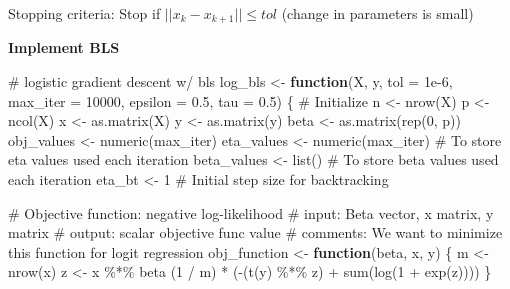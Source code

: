 \documentclass[
  letterpaper,
  DIV=11,
  numbers=noendperiod]{scrartcl}
\newenvironment{Shaded}{\begin{snugshade}}{\end{snugshade}}
\newcommand{\AttributeTok}[1]{\textcolor[rgb]{0.40,0.45,0.13}{#1}}
\newcommand{\CommentTok}[1]{\textcolor[rgb]{0.37,0.37,0.37}{#1}}
\newcommand{\ControlFlowTok}[1]{\textcolor[rgb]{0.00,0.23,0.31}{\textbf{#1}}}
\newcommand{\DecValTok}[1]{\textcolor[rgb]{0.68,0.00,0.00}{#1}}
\newcommand{\FloatTok}[1]{\textcolor[rgb]{0.68,0.00,0.00}{#1}}
\newcommand{\FunctionTok}[1]{\textcolor[rgb]{0.28,0.35,0.67}{#1}}
\newcommand{\NormalTok}[1]{\textcolor[rgb]{0.00,0.23,0.31}{#1}}
\newcommand{\OtherTok}[1]{\textcolor[rgb]{0.00,0.23,0.31}{#1}}
\newcommand{\SpecialCharTok}[1]{\textcolor[rgb]{0.37,0.37,0.37}{#1}}
\begin{document}
Stopping criteria: Stop if \(||x_k - x_{k+1}|| ≤ tol\) (change in
parameters is small)

\textbf{Implement BLS}

\begin{Shaded}
\begin{Highlighting}[]
\CommentTok{\# logistic gradient descent w/ bls}
\NormalTok{log\_bls }\OtherTok{\textless{}{-}} \ControlFlowTok{function}\NormalTok{(X, y, }\AttributeTok{tol =} \FloatTok{1e{-}6}\NormalTok{, }\AttributeTok{max\_iter =} \DecValTok{10000}\NormalTok{, }\AttributeTok{epsilon =} \FloatTok{0.5}\NormalTok{, }\AttributeTok{tau =} \FloatTok{0.5}\NormalTok{) \{}
  \CommentTok{\# Initialize}
\NormalTok{  n }\OtherTok{\textless{}{-}} \FunctionTok{nrow}\NormalTok{(X)}
\NormalTok{  p }\OtherTok{\textless{}{-}} \FunctionTok{ncol}\NormalTok{(X)}
\NormalTok{  x }\OtherTok{\textless{}{-}} \FunctionTok{as.matrix}\NormalTok{(X)}
\NormalTok{  y }\OtherTok{\textless{}{-}} \FunctionTok{as.matrix}\NormalTok{(y)}
\NormalTok{  beta }\OtherTok{\textless{}{-}} \FunctionTok{as.matrix}\NormalTok{(}\FunctionTok{rep}\NormalTok{(}\DecValTok{0}\NormalTok{, p))}
\NormalTok{  obj\_values }\OtherTok{\textless{}{-}} \FunctionTok{numeric}\NormalTok{(max\_iter)}
\NormalTok{  eta\_values }\OtherTok{\textless{}{-}} \FunctionTok{numeric}\NormalTok{(max\_iter)  }\CommentTok{\# To store eta values used each iteration}
\NormalTok{  beta\_values }\OtherTok{\textless{}{-}} \FunctionTok{list}\NormalTok{() }\CommentTok{\# To store beta values used each iteration}
\NormalTok{  eta\_bt }\OtherTok{\textless{}{-}} \DecValTok{1}  \CommentTok{\# Initial step size for backtracking}
  
  \CommentTok{\# Objective function: negative log{-}likelihood}
  \CommentTok{\# input: Beta vector, x matrix, y matrix}
  \CommentTok{\# output: scalar objective func value}
  \CommentTok{\# comments: We want to minimize this function for logit regression}
\NormalTok{  obj\_function }\OtherTok{\textless{}{-}} \ControlFlowTok{function}\NormalTok{(beta, x, y) \{}
\NormalTok{    m }\OtherTok{\textless{}{-}} \FunctionTok{nrow}\NormalTok{(x)}
\NormalTok{    z }\OtherTok{\textless{}{-}}\NormalTok{ x }\SpecialCharTok{\%*\%}\NormalTok{ beta}
\NormalTok{    (}\DecValTok{1} \SpecialCharTok{/}\NormalTok{ m) }\SpecialCharTok{*}\NormalTok{ (}\SpecialCharTok{{-}}\NormalTok{(}\FunctionTok{t}\NormalTok{(y) }\SpecialCharTok{\%*\%}\NormalTok{ z) }\SpecialCharTok{+} \FunctionTok{sum}\NormalTok{(}\FunctionTok{log}\NormalTok{(}\DecValTok{1} \SpecialCharTok{+} \FunctionTok{exp}\NormalTok{(z))))}
\NormalTok{  \}}
  

\end{Highlighting}
\end{Shaded}
\end{document}
